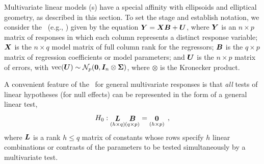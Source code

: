 


Multivariate linear models (\MLM{}s) have a special affinity with ellipsoids and elliptical geometry,
as described in this section.  To set the stage and establish notation, we consider
the \MLM\ (e.g., \citet{Timm:75}) given by
the equation $\bm{Y}=\bm{XB}+\bm{U}$, where $\bm{Y}$ is an $%
n\times p$ matrix of responses in which each column represents a distinct
response variable; $\bm{X}$ is the  $n\times q$ model matrix of full
column rank for the regressors; $\bm{B}$ is the $q \times p$ matrix
of regression coefficients or model parameters; and $\bm{U}$ is the $n \times p$
matrix of errors,
with $\textrm{vec}(\bm{U}) \sim \mathcal{N}_p ( \bm{0}, \bm{I}_n \otimes \bm{\Sigma} )$,
where $\otimes$ is the Kronecker product.

A convenient feature of the \MLM\ for general multivariate responses is that
\emph{all} tests of linear hypotheses (for null effects) can be represented in the form of a general
linear test,
\begin{equation}\label{eq:mglt}
H_0: \mathord{\mathop{\bm{L}}\limits_{(h \times q)}}
\mathord{\mathop{\bm{B}}\limits_{(q \times p)}} =
\mathord{\mathop{\bm{0}}\limits_{(h \times p)}}
\:\: ,
\end{equation}
where $\bm{L}$ is a rank $h \leq q$ matrix of constants whose rows specify
$h$ linear combinations or contrasts
of the parameters to be tested simultaneously
by a multivariate test.

